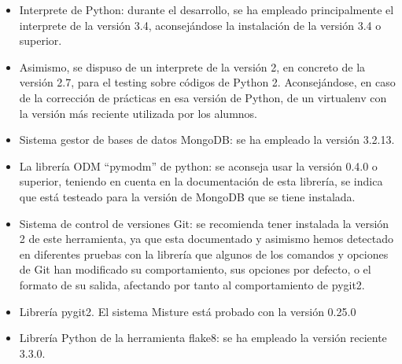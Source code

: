 \begin{itemize}
\item Interprete de Python: durante el desarrollo, se ha empleado principalmente el interprete de la versión 3.4, aconsejándose la instalación de la versión 3.4 o superior.\\

\item Asimismo, se dispuso de un interprete de la versión 2, en concreto de la versión 2.7, para el testing sobre códigos de Python 2. Aconsejándose, en caso de la corrección de prácticas en esa versión de Python, de un virtualenv con la versión más reciente utilizada por los alumnos.\\

\item Sistema gestor de bases de datos MongoDB: se ha empleado la versión 3.2.13.\\

\item La librería ODM ``pymodm'' de python: se aconseja usar la versión 0.4.0 o superior, teniendo en cuenta en la documentación de esta librería, se indica que está testeado para la versión de MongoDB que se tiene instalada.\\

\item Sistema de control de versiones Git: se recomienda tener instalada la versión 2 de este herramienta, ya que esta documentado y asimismo hemos detectado en diferentes pruebas con la librería que algunos de los comandos y opciones de Git han modificado su comportamiento, sus opciones por defecto, o el formato de su salida, afectando por tanto al comportamiento de pygit2.\\

\item Librería pygit2. El sistema Misture está probado con la versión 0.25.0\\

\item Librería Python de la herramienta flake8: se ha empleado la versión reciente 3.3.0.
\end{itemize}



